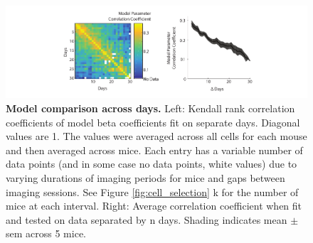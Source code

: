 \begin{figure}
\includegraphics[width=\textwidth]{figures/4_glm_model_comparison.pdf}
\caption[Model comparison across days.]{\textbf{Model comparison across days.} Left: Kendall rank correlation coefficients of model beta coefficients fit on separate days. Diagonal values are 1. The values were averaged across all cells for each mouse and then averaged across mice. Each entry has a variable number of data points (and in some case no data points, white values) due to varying durations of imaging periods for mice and gaps between imaging sessions. See Figure \ref{fig:cell_selection} k for the number of mice at each interval. Right: Average correlation coefficient when fit and tested on data separated by n days. Shading indicates mean $\pm$ sem across 5 mice.
\label{fig:model_comparison}}
\end{figure}

\bigskip

